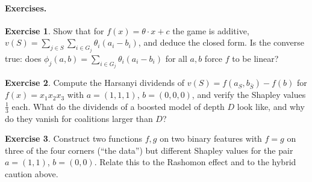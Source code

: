 \documentclass[11pt]{article}
\theoremstyle{definition}
\newtheorem{exercise}{Exercise}[section]
\theoremstyle{plain}
\theoremstyle{remark}
\renewcommand{\_}{\oldunderscore\allowbreak}
\begin{document}
\paragraph{Exercises.}
\begin{exercise}\label{ex:linshap}
Show that for $f(x)=\theta\cdot x+c$ the game is additive, $v(S)=\sum_{j\in S}\sum_{i\in G_j}\theta_i(a_i-b_i)$, and deduce the closed form. Is the converse true: does
$\phi_j(a,b)=\sum_{i\in G_j}\theta_i(a_i-b_i)$ for all $a,b$ force $f$ to be linear?
\end{exercise}
\begin{exercise}
Compute the Harsanyi dividends of $v(S)=f(a_S,b_{\bar S})-f(b)$ for $f(x)=x_1x_2x_3$ with $a=(1,1,1)$, $b=(0,0,0)$, and verify the Shapley values $\frac13$ each. What do the dividends of a boosted
model of depth $D$ look like, and why do they vanish for coalitions larger than $D$?
\end{exercise}
\begin{exercise}
Construct two functions $f,g$ on two binary features with $f=g$ on three of the four corners (``the data'') but different Shapley values for the pair $a=(1,1)$, $b=(0,0)$. Relate this to the
Rashomon effect and to the hybrid caution above.
\end{exercise}
\end{document}
